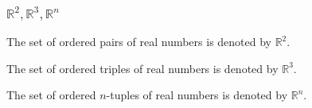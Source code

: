 \begin{frame}
\frametitle{$\mathbb R^2, \mathbb R^3, \mathbb R^n$}
\begin{definition}[$\mathbb R^2$]
The set of ordered pairs of real numbers is denoted by $\mathbb R^2$.
\end{definition}
\begin{definition}[$\mathbb R^3$]
The set of ordered triples of real numbers is denoted by $\mathbb R^3$.
\end{definition}
\begin{definition}[$\mathbb R^n$]
The set of ordered $n$-tuples of real numbers is denoted by $\mathbb R^n$.
\end{definition}
\end{frame}